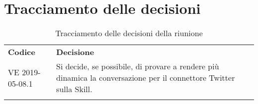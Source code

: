 \clearpage
\section{Tracciamento delle decisioni}
\label{sec:tracciamento}
\begin{center}
	\renewcommand{\arraystretch}{1.5}
	\begin{longtable}{  p{2.8cm} p{11.4cm} }
		\rowcolor{tableHeadYellow}
		\textbf{Codice}&\textbf{Decisione}\\
		VE 2019-05-08.1 & Si decide, se possibile, di provare a rendere più dinamica la conversazione per il connettore Twitter sulla Skill.\\
		\rowcolor{white}
		\caption{Tracciamento delle decisioni della riunione}
	\end{longtable}	
\end{center}